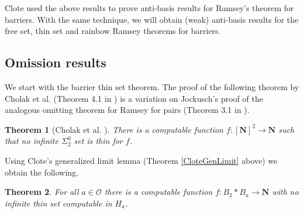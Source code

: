 \documentclass{amsart}
\theoremstyle{plain}
\theoremstyle{plain}
\newtheorem{theorem}{Theorem}
\newcommand\Nat{\mathbf{N}}
\begin{document}
Clote \cite{Clote1984} used the above results to prove anti-basis results for Ramsey's theorem for barriers. With the same technique, we will obtain (weak) anti-basis results for the free set, thin set and rainbow Ramsey theorems 
for barriers. 

\subsection{Omission results}

We start with the barrier thin set theorem. 
The proof of the following theorem by Cholak et al. (Theorem 4.1 in \cite{Cholak_Giusto_Hirst_Jockusch_2005}) is a variation on Jockusch's proof of the analogous omitting theorem for Ramsey for pairs (Theorem 3.1 in \cite{Jockusch1972}).

\begin{theorem}[Cholak et al. \cite{Cholak_Giusto_Hirst_Jockusch_2005}]
There is a computable function $f:[\Nat]^2 \to \Nat$ such that no infinite $\Sigma^0_2$ set is thin for $f$. 
\end{theorem}

Using Clote's generalized limit lemma (Theorem \ref{CloteGenLimit} above) we obtain the following. 

\begin{theorem} \label{ThinNoCom}
For all $a \in \mathcal{O}$ there is a computable function $f: B_2 * B_a \to \Nat$ with no infinite thin set
computable in $H_a$. 
\end{theorem}
\end{document}
